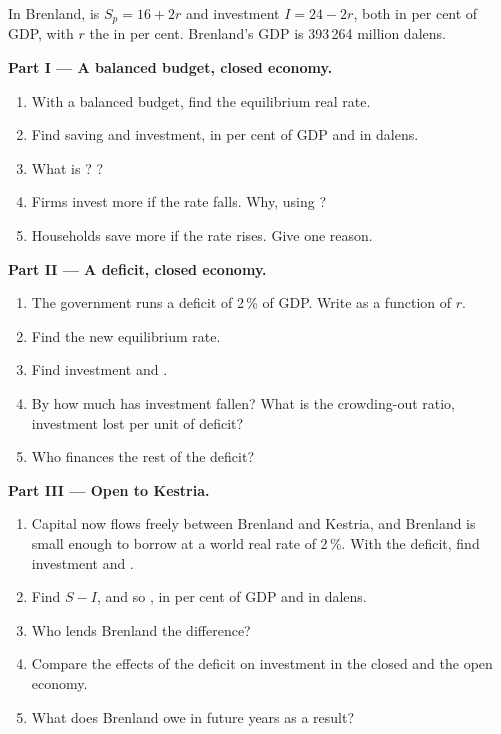 \begin{problem}
\label{pb:g12:saving-and-investment:1}
In Brenland,  is $S_p = 16 + 2r$ and investment $I = 24 - 2r$, both in per cent of GDP, with $r$ the  in per cent. Brenland's GDP is 393\,264
million dalens.

\medskip
\noindent\textbf{Part I --- A balanced budget, closed economy.}
\begin{enumerate}
\item With a balanced budget, find the equilibrium real rate.
\item Find saving and investment, in per cent of GDP and in dalens.
\item What is ? ?
\item Firms invest more if the rate falls. Why, using ?
\item Households save more if the rate rises. Give one reason.
\end{enumerate}

\medskip
\noindent\textbf{Part II --- A deficit, closed economy.}
\begin{enumerate}[resume]
\item The government runs a deficit of 2\,\% of GDP. Write  as a function of $r$.
\item Find the new equilibrium rate.
\item Find investment and .
\item By how much has investment fallen? What is the crowding-out ratio, investment lost per unit of deficit?
\item Who finances the rest of the deficit?
\end{enumerate}

\medskip
\noindent\textbf{Part III --- Open to Kestria.}
\begin{enumerate}[resume]
\item Capital now flows freely between Brenland and Kestria, and Brenland is small enough to borrow at a world real rate of 2\,\%. With the deficit, find investment and
  .
\item Find $S - I$, and so , in per cent of GDP and in dalens.
\item Who lends Brenland the difference?
\item Compare the effects of the deficit on investment in the closed and the open economy.
\item What does Brenland owe in future years as a result?
\end{enumerate}


\end{problem}
